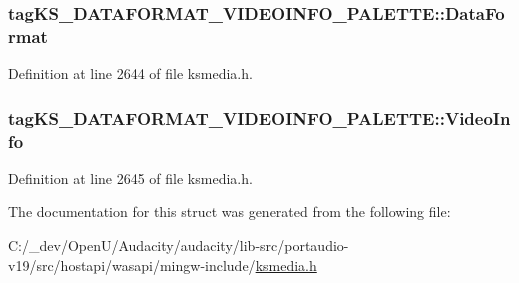\subsubsection[{\texorpdfstring{Data\+Format}{DataFormat}}]{ tag\+K\+S\+\_\+\+D\+A\+T\+A\+F\+O\+R\+M\+A\+T\+\_\+\+V\+I\+D\+E\+O\+I\+N\+F\+O\+\_\+\+P\+A\+L\+E\+T\+T\+E\+::\+Data\+Format}\hypertarget{structtag_k_s___d_a_t_a_f_o_r_m_a_t___v_i_d_e_o_i_n_f_o___p_a_l_e_t_t_e_a5302cc12786aa204d269e0dc77f2138a}{}\label{structtag_k_s___d_a_t_a_f_o_r_m_a_t___v_i_d_e_o_i_n_f_o___p_a_l_e_t_t_e_a5302cc12786aa204d269e0dc77f2138a}


Definition at line 2644 of file ksmedia.\+h.

\subsubsection[{\texorpdfstring{Video\+Info}{VideoInfo}}]{ tag\+K\+S\+\_\+\+D\+A\+T\+A\+F\+O\+R\+M\+A\+T\+\_\+\+V\+I\+D\+E\+O\+I\+N\+F\+O\+\_\+\+P\+A\+L\+E\+T\+T\+E\+::\+Video\+Info}\hypertarget{structtag_k_s___d_a_t_a_f_o_r_m_a_t___v_i_d_e_o_i_n_f_o___p_a_l_e_t_t_e_a53c7366f60dc86eb0873605e4c85b791}{}\label{structtag_k_s___d_a_t_a_f_o_r_m_a_t___v_i_d_e_o_i_n_f_o___p_a_l_e_t_t_e_a53c7366f60dc86eb0873605e4c85b791}


Definition at line 2645 of file ksmedia.\+h.



The documentation for this struct was generated from the following file\+:\begin{DoxyCompactItemize}
\item 
C\+:/\+\_\+dev/\+Open\+U/\+Audacity/audacity/lib-\/src/portaudio-\/v19/src/hostapi/wasapi/mingw-\/include/\hyperlink{ksmedia_8h}{ksmedia.\+h}\end{DoxyCompactItemize}
